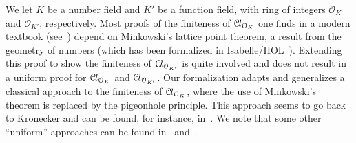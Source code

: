 \documentclass[a4paper,USenglish,cleveref, autoref, thm-restate]{lipics-v2021}
\newcommand*{\OK}[1][K]{\mathcal{O}_{#1}}
\newcommand*{\Cl}{\mathcal{C}\kern-.075em l}
\newcommand{\mathlib}{\textsf{mathlib}\xspace}
\begin{document}
We let $K$ be a number field and $K'$ be a function field, with ring of integers $\OK$ and $\OK[K']$, respectively. 
Most proofs of the finiteness of $\Cl_{\OK}$ one finds in a modern textbook (see~\cite[Theorems 4.4,~5.3,~6.3]{Neukirch}) depend on Minkowski's lattice point theorem, a result from the geometry of numbers (which has been formalized in Isabelle/HOL~\cite{Minkowskis_Theorem-AFP}).
Extending this proof to show the finiteness of $\Cl_{\OK[K']}$ is quite involved and does not result in a uniform proof for $\Cl_{\OK}$ and $\Cl_{\OK[K']}$.
Our formalization adapts and generalizes a classical approach to the finiteness of $\Cl_{\OK}$, where the use of Minkowski's theorem is replaced by the pigeonhole principle. This approach seems to go back to Kronecker
and can be found, for instance, in~\cite{Ireland-Rosen}. 
We note that some other ``uniform'' approaches can be found in~\cite{Artin-Whaples} and~\cite{Stasinski}.
\end{document}
